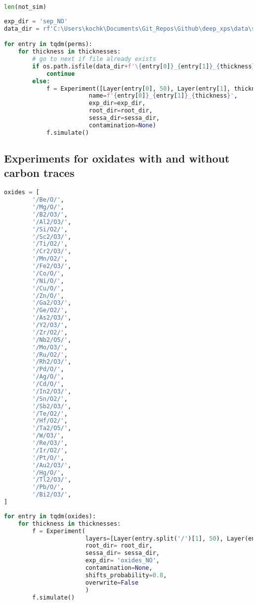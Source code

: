 \begin{lstlisting}[language=Python]
len(not_sim)
\end{lstlisting}

\begin{lstlisting}[language=Python]
exp_dir = 'sep_NO'
data_dir = rf'C:\Users\kochk\Documents\Git_Repos\Github\deep_xps\data\simulation_data\{exp_dir}'

for entry in tqdm(perms):
    for thickness in thicknesses:
        # go to next if file already exists
        if os.path.isfile(data_dir+f'\{entry[0]}_{entry[1]}_{thickness}_separate_spectra.spcreg1.spc'):
            continue
        else:
            f = Experiment([Layer(entry[0], 50), Layer(entry[1], thickness)],
                        name=f'{entry[0]}_{entry[1]}_{thickness}',
                        exp_dir=exp_dir,
                        root_dir=root_dir,
                        sessa_dir=sessa_dir,
                        contamination=None)
            f.simulate()
\end{lstlisting}

\hypertarget{experiments-for-oxidates-with-and-without-carbon-traces}{%
\subsection{Experiments for oxidates with and without carbon
traces}\label{experiments-for-oxidates-with-and-without-carbon-traces}}

\begin{lstlisting}[language=Python]
oxides = [
        '/Be/O/',
        '/Mg/O/',
        '/B2/O3/',
        '/Al2/O3/',
        '/Si/O2/',
        '/Sc2/O3/',
        '/Ti/O2/',
        '/Cr2/O3/',
        '/Mn/O2/',
        '/Fe2/O3/',
        '/Co/O/',
        '/Ni/O/',
        '/Cu/O/',
        '/Zn/O/',
        '/Ga2/O3/',
        '/Ge/O2/',
        '/As2/O3/',
        '/Y2/O3/',
        '/Zr/O2/',
        '/Nb2/O5/',
        '/Mo/O3/',
        '/Ru/O2/',
        '/Rh2/O3/',
        '/Pd/O/',
        '/Ag/O/',
        '/Cd/O/',
        '/In2/O3/',
        '/Sn/O2/',
        '/Sb2/O3/',
        '/Te/O2/',
        '/Hf/O2/',
        '/Ta2/O5/',
        '/W/O3/',
        '/Re/O3/',
        '/Ir/O2/',
        '/Pt/O/',
        '/Au2/O3/',
        '/Hg/O/',
        '/Tl2/O3/',
        '/Pb/O/',
        '/Bi2/O3/',
]
\end{lstlisting}

\begin{lstlisting}[language=Python]
for entry in tqdm(oxides):
    for thickness in thicknesses:
        f = Experiment(
                       layers=[Layer(entry.split('/')[1], 50), Layer(entry, thickness)],
                       root_dir= root_dir,
                       sessa_dir= sessa_dir,
                       exp_dir= 'oxides_NO',
                       contamination=None,
                       shifts_probability=0.8,
                       overwrite=False
                       )
        f.simulate()
\end{lstlisting}

